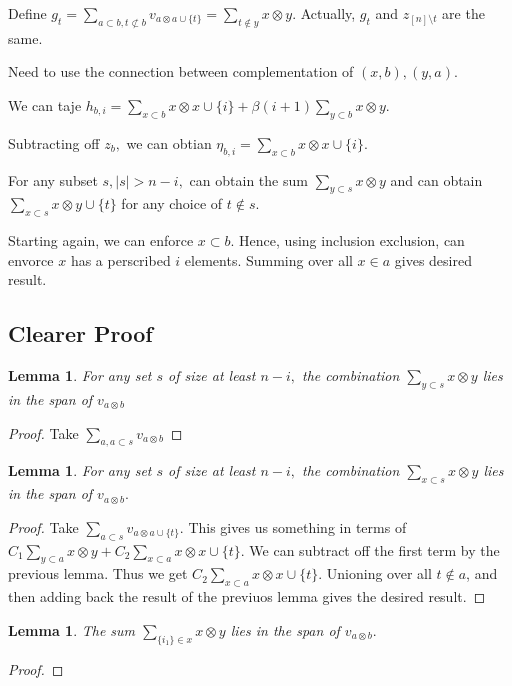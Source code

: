 \documentclass{amsart}
\newtheorem{lem}[subsubsection]{Lemma}
\begin{document}
Define $g_t = \sum_{a\subset b,t\not\subset b}^{}v_{a \otimes a \cup \{t\}}= \sum_{t \notin y}^{}x\otimes y.$
Actually, $g_t$ and $z_{[n]\setminus t}$ are the same.

Need to use the connection between complementation of $(x,b),(y,a).$

We can taje $h_{b,i} = \sum_{x\subset b}^{}x \otimes x \cup \{i\} + \beta(i+1)\sum_{y \subset b}^{}x\otimes y.$

Subtracting off $z_b,$ we can obtian
$\eta_{b,i} = \sum_{x\subset b}^{}x \otimes x \cup \{i\}.$

For any subset $s,|s|>n-i,$ can obtain the sum $\sum_{y \subset s}^{}x\otimes y$ and can obtain $\sum_{x\subset s}^{}x\otimes y \cup \{t\}$ for any choice of $t \notin s.$

Starting again, we can enforce $x \subset b.$ Hence, using inclusion exclusion, can envorce $x$ has a perscribed $i$ elements. Summing over all $x \in a$ gives desired result.

\subsection{Clearer Proof}

\begin{lem}
For any set $s$ of size at least $n-i,$ the combination $\sum_{y \subset s}^{}x\otimes y$ lies in the span of $v_{a\otimes b}$
\end{lem}
\begin{proof}
Take $\sum_{a,a\subset s}^{}v_{a\otimes b}$
\end{proof}

\begin{lem}
For any set $s$ of size at least $n-i,$ the combination $\sum_{x \subset s}^{}x\otimes y$ lies in the span of $v_{a\otimes b}.$
\end{lem}
\begin{proof}
Take $\sum_{a \subset s}^{}v_{a\otimes a \cup \{t\}}.$ This gives us something in terms of $C_1\sum_{y\subset a}^{}x\otimes y + C_2\sum_{x\subset a}^{} x\otimes x\cup \{t\}.$ We can subtract off the first term by the previous lemma. Thus we get $C_2\sum_{x\subset a}^{} x\otimes x\cup \{t\}.$ Unioning over all $t \notin a$, and then adding back the result of the previuos lemma gives the desired result.
\end{proof}

\begin{lem}
The sum $\sum_{\{i_1\}\in x}^{}x\otimes y$ lies in the span of $v_{a\otimes b}.$
\end{lem}
\begin{proof}

\end{proof}
\end{document}
